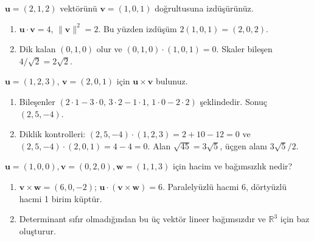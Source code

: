 \begin{tcolorbox}[title={Örnek 1.3 | İzdüşüm hesabı},colframe=accent]\(\mathbf u=(2,1,2)\) vektörünü \(\mathbf v=(1,0,1)\) doğrultusuna izdüşürünüz.
\par\vspace{1mm}{\scriptsize\sffamily Pekiştirme}\end{tcolorbox}
\begin{tcolorbox}[title={Adım adım çözüm},colback=green!3!white,colframe=green]\begin{enumerate}
\item \(\mathbf u\cdot\mathbf v=4\), \(\|\mathbf v\|^2=2\). Bu yüzden izdüşüm \(2(1,0,1)=(2,0,2)\).
\item Dik kalan \((0,1,0)\) olur ve \((0,1,0)\cdot(1,0,1)=0\). Skaler bileşen \(4/\sqrt2=2\sqrt2\).
\end{enumerate}\end{tcolorbox}
\begin{tcolorbox}[title={Örnek 1.4 | Tahtadaki vektörel çarpım},colframe=accent]\(\mathbf u=(1,2,3)\), \(\mathbf v=(2,0,1)\) için \(\mathbf u\times\mathbf v\) bulunuz.
\par{}\end{tcolorbox}
\begin{tcolorbox}[title={Adım adım çözüm},colback=green!3!white,colframe=green]\begin{enumerate}
\item Bileşenler \((2\cdot1-3\cdot0,\,3\cdot2-1\cdot1,\,1\cdot0-2\cdot2)\) şeklindedir. Sonuç \((2,5,-4)\).
\item Diklik kontrolleri: \((2,5,-4)\cdot(1,2,3)=2+10-12=0\) ve \((2,5,-4)\cdot(2,0,1)=4-4=0\). Alan \(\sqrt{45}=3\sqrt5\), üçgen alanı \(3\sqrt5/2\).
\end{enumerate}\end{tcolorbox}
\begin{tcolorbox}[title={Örnek 1.5 | Hacim ve bağımsızlık},colframe=accent]\(\mathbf u=(1,0,0),\mathbf v=(0,2,0),\mathbf w=(1,1,3)\) için hacim ve bağımsızlık nedir?
\par\vspace{1mm}{\scriptsize\sffamily Pekiştirme}\end{tcolorbox}
\begin{tcolorbox}[title={Adım adım çözüm},colback=green!3!white,colframe=green]\begin{enumerate}
\item \(\mathbf v\times\mathbf w=(6,0,-2)\); \(\mathbf u\cdot(\mathbf v\times\mathbf w)=6\). Paralelyüzlü hacmi 6, dörtyüzlü hacmi 1 birim küptür.
\item Determinant sıfır olmadığından bu üç vektör lineer bağımsızdır ve \(\mathbb R^3\) için baz oluşturur.
\end{enumerate}\end{tcolorbox}
